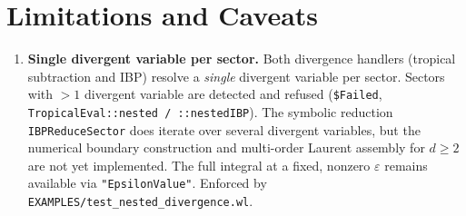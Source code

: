 \documentclass[11pt,a4paper]{article}
\begin{document}
\section{Limitations and Caveats}\label{sec:limitations}

\begin{enumerate}

\item \textbf{Single divergent variable per sector.}
Both divergence handlers (tropical subtraction and IBP) resolve a \emph{single} divergent variable per sector. Sectors with $>1$ divergent variable are detected and refused (\texttt{\$Failed}, \texttt{TropicalEval::nested\,/\,::nestedIBP}). The symbolic reduction \texttt{IBPReduceSector} does iterate over several divergent variables, but the numerical boundary construction and multi-order Laurent assembly for $d\geq 2$ are not yet implemented. The full integral at a fixed, nonzero $\varepsilon$ remains available via \texttt{"EpsilonValue"}. Enforced by \texttt{EXAMPLES/test\_nested\_divergence.wl}.


\end{enumerate}
\end{document}
